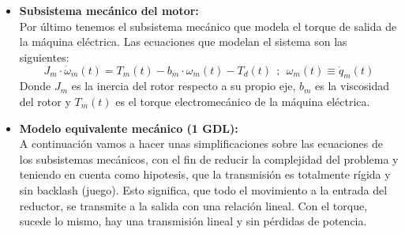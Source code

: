 \documentclass[10pt]{article}
\begin{document}
\begin{itemize}
	\item \textbf{Subsistema mecánico del motor:}\vspace{0.3cm}\\
	Por último tenemos el subsistema mecánico que modela el torque de salida de la máquina eléctrica. Las ecuaciones que modelan el sistema son las siguientes:
	\begin{equation}
		\label{eqn:sistMecanicoMotor}
		J_{m}\cdot \dot{\omega }_{m}\left ( t \right )=T_{m}\left ( t \right )-b_{m}\cdot \omega_{m}\left ( t \right )-T_{d}\left ( t \right ) \ \ ;\ \ \omega_{m}\left ( t \right )\equiv \dot{q}_{m}\left ( t \right )
	\end{equation}
	Donde $J_{m}$ es la inercia del rotor respecto a su propio eje, $b_{m}$ es la viscosidad del rotor y $T_{m}(t)$ es el torque electromecánico de la máquina eléctrica.

	\item \textbf{Modelo equivalente mecánico (1 GDL):}\vspace{0.3cm}\\
	A continuación vamos a hacer unas simplificaciones sobre las ecuaciones de los subsistemas mecánicos, con el fin de reducir la complejidad del problema y teniendo en cuenta como hipotesis, que la transmisión es totalmente rígida y sin backlash (juego).
	Esto significa, que todo el movimiento a la entrada del reductor, se transmite a la salida con una relación lineal. Con el torque, sucede lo mismo, hay una transmisión lineal y sin pérdidas de potencia.


\end{itemize}
\end{document}
